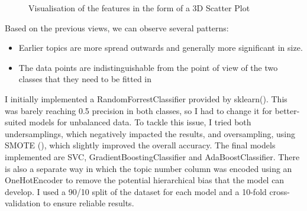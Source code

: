 \documentclass[12pt,MSc,a4paper,oneside]{muthesis}
\begin{document}
    \begin{figure}[h]
      \centering
      \caption{Visualisation of the features in the form of a 3D Scatter Plot}
      \label{fig:foobar}
    \end{figure}

    \newpage

    Based on the previous views, we can observe several patterns:
    \begin{itemize}
      \item Earlier topics are more spread outwards and generally more significant in size.
      \item The data points are indistinguishable from the point of view of the two classes that they need to be fitted in
    \end{itemize}

    I initially implemented a RandomForrestClassifier provided by sklearn(\cite{scikit-learn}). This was barely reaching 0.5 precision in both classes, so I had to change it for better-suited models for unbalanced data. To tackle this issue, I tried both undersamplings, which negatively impacted the results, and oversampling, using SMOTE (\cite{JMLR:v18:16-365}), which slightly improved the overall accuracy.
    The final models implemented are SVC, GradientBoostingClassifier and AdaBoostClassifier.
    There is also a separate way in which the topic number column was encoded using an OneHotEncoder to remove the potential hierarchical bias that the model can develop.
    I used a 90/10 split of the dataset for each model and a 10-fold cross-validation to ensure reliable results.
\end{document}
